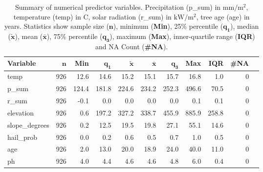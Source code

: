 \documentclass[review]{elsarticle}
\begin{document}
\begin{table}[H] 
\centering
\begingroup\footnotesize
\begin{tabular}{lrrrrrrrrrr}
	\textbf{Variable} & $\mathbf{n}$ & \textbf{Min} & $\mathbf{q_1}$ & $\mathbf{\widetilde{x}}$ & $\mathbf{\bar{x}}$ & $\mathbf{q_3}$ & \textbf{Max} & \textbf{IQR} & \textbf{\#NA} \\
	\hline
	temp              & 926          & 12.6         & 14.6           & 15.2                     & 15.1               & 15.7           & 16.8         & 1.0          & 0             \\
	p\_sum            & 926          & 124.4        & 181.8          & 224.6                    & 234.2              & 252.3          & 496.6        & 70.5         & 0             \\
	r\_sum            & 926          & -0.1         & 0.0            & 0.0                      & 0.0                & 0.0            & 0.1          & 0.1          & 0             \\
	elevation         & 926          & 0.6          & 197.2          & 327.2                    & 338.7              & 455.9          & 885.9        & 258.8        & 0             \\
	slope\_degrees    & 926          & 0.2          & 12.5           & 19.5                     & 19.8               & 27.1           & 55.1         & 14.6         & 0             \\
	hail\_prob        & 926          & 0.0          & 0.2            & 0.6                      & 0.5                & 0.7            & 1.0          & 0.5          & 0             \\
	age               & 926          & 2.0          & 13.0           & 20.0                     & 18.9               & 24.0           & 40.0         & 11.0         & 0             \\
	ph                & 926          & 4.0          & 4.4            & 4.6                      & 4.6                & 4.8            & 6.0          & 0.4          & 0             \\
\end{tabular}
\endgroup
\caption{Summary of numerical predictor variables. Precipitation (p\_sum) in $\mathrm{mm/m^{2}}$, temperature (temp) in \degree C, solar radiation (r\_sum) in $\mathrm{kW/m^{2}}$, tree age (age) in years. Statistics show sample size ($\mathbf{n}$), minimum (\textbf{Min}), 25\% percentile ($\mathbf{q_1}$), median ($\mathbf{\widetilde{x}}$), mean ($\mathbf{\bar{x}}$), 75\% percentile ($\mathbf{q_3}$), maximum (\textbf{Max}), inner-quartile range (\textbf{IQR}) and NA Count (\textbf{\#NA}).}
\label{table:descriptive_summary_numeric}
\end{table}
\end{document}
